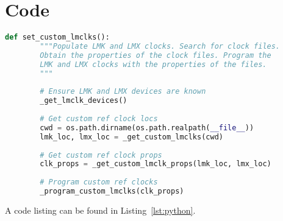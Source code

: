 \section{Code}\label{sec:code}

\begin{lstlisting}[language=Python, caption={The preprocessing step}, label=lst:python]
    def set_custom_lmclks():
        """Populate LMK and LMX clocks. Search for clock files.
        Obtain the properties of the clock files. Program the
        LMK and LMX clocks with the properties of the files.
        """
        
        # Ensure LMK and LMX devices are known
        _get_lmclk_devices()
        
        # Get custom ref clock locs
        cwd = os.path.dirname(os.path.realpath(__file__))
        lmk_loc, lmx_loc = _get_custom_lmclks(cwd)
        
        # Get custom ref clock props
        clk_props = _get_custom_lmclk_props(lmk_loc, lmx_loc)
        
        # Program custom ref clocks
        _program_custom_lmclks(clk_props)
\end{lstlisting}

A code listing can be found in Listing~\ref{lst:python}.
